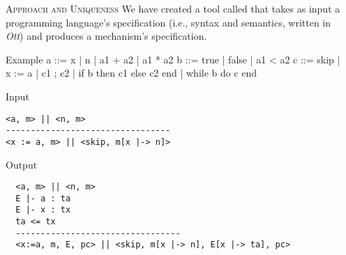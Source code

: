 \documentclass[final]{beamer}
\newlength{\onecolwid}
\newlength{\twocolwid}
\begin{document}
\begin{frame}[fragile]
\begin{columns}[t]
\begin{column}{\onecolwid}
\end{column}
\begin{column}{\twocolwid}

\begin{block}{\textsc{Approach and Uniqueness}}
We have created a tool called \emph{\ottifc} that takes as input a programming language's specification (i.e., syntax and semantics, written in \emph{Ott}) and produces a mechanism's specification. 

\begin{alertblock}{Example}
a ::= x | n | a1 + a2 | a1 * a2 
b ::= true | false | a1 < a2
c ::= skip | x := a | c1 ; c2 | 
        if b then c1 else c2 end | 
        while b do c end   
\end{alertblock}      

\end{block}



\noindent
\begin{minipage}[t]{0.48\linewidth}
\begin{alertblock}{Input}
\begin{lstlisting}
<a, m> || <n, m>
---------------------------------
<x := a, m> || <skip, m[x |-> n]>\end{lstlisting}        
\end{alertblock}
\end{minipage}
\hfill%
\begin{minipage}[t]{0.48\linewidth}
\begin{alertblock}{Output}
\begin{lstlisting}
  <a, m> || <n, m>
  E |- a : ta
  E |- x : tx
  ta <= tx
  ---------------------------------
  <x:=a, m, E, pc> || <skip, m[x |-> n], E[x |-> ta], pc>    
\end{lstlisting}
\end{alertblock}
\end{minipage}




\end{column}
\end{columns}
\end{frame}
\end{document}
